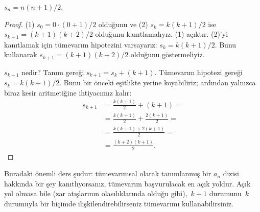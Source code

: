 \begin{prop}
  $s_n = n(n+1)/2$.
\end{prop}

\begin{proof}
  (1) $s_0 = 0\cdot(0 + 1)/2$ olduğunu ve (2) $s_k = k(k+1)/2$ ise
  $s_{k+1} = (k+1)(k+2)/2$ olduğunu kanıtlamalıyız. (1) açıktır.
  (2)'yi kanıtlamak için tümevarım hipotezini varsayarız: $s_k =
  k(k+1)/2$. Bunu kullanarak $s_{k+1} = (k+1)(k+2)/2$ olduğunu
  göstermeliyiz.

  $s_{k+1}$ nedir? Tanım gereği $s_{k+1} = s_k + (k+1)$. Tümevarım
  hipotezi gereği $s_k = k(k+1)/2$. Bunu bir önceki eşitlikte yerine
  koyabiliriz; ardından yalnızca biraz kesir aritmetiğine ihtiyacımız
  kalır:
  \begin{align*}
    s_{k+1} & = \frac{k(k+1)}{2} + (k+1) = {}\\
    & = \frac{k(k+1)}{2} + \frac{2(k+1)}{2} = {}\\
    & = \frac{k(k+1) + 2(k+1)}{2} = {}\\
    & = \frac{(k+2)(k+1)}{2}.
  \end{align*}
\end{proof}

Buradaki önemli ders şudur: tümevarımsal olarak tanımlanmış bir $a_n$
dizisi hakkında bir şey kanıtlıyorsanız, tümevarım başvurulacak en açık
yoldur. Açık yol olmasa bile (zar atışlarının olasılıklarında olduğu
gibi),~$k+1$ durumunu~$k$ durumuyla bir biçimde ilişkilendirebilirseniz
tümevarımı kullanabilirsiniz.

